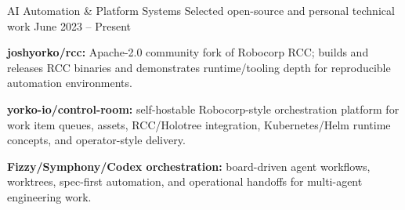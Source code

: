 


\begin{cventries}


\cventry
{AI Automation \& Platform Systems} %
{Selected open-source and personal technical work} %
{} %
{June 2023 -- Present} %
{ %
	\begin{cvitems}
		\item {\textbf{joshyorko/rcc:} Apache-2.0 community fork of Robocorp RCC; builds and releases RCC binaries and demonstrates runtime/tooling depth for reproducible automation environments.}
		\item {\textbf{yorko-io/control-room:} self-hostable Robocorp-style orchestration platform for work item queues, assets, RCC/Holotree integration, Kubernetes/Helm runtime concepts, and operator-style delivery.}
		\item {\textbf{Fizzy/Symphony/Codex orchestration:} board-driven agent workflows, worktrees, spec-first automation, and operational handoffs for multi-agent engineering work.}
	\end{cvitems}
}


\end{cventries}
